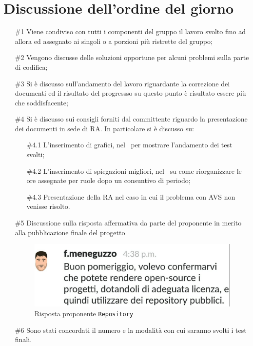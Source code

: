 \documentclass[../verbale-2017-05-03.tex]{subfiles}
\begin{document}
	\section{Discussione dell'ordine del giorno}
	\begin{itemize}
		\item [\#1] Viene condiviso con tutti i componenti del gruppo il lavoro svolto fino ad allora ed assegnato ai singoli o a porzioni più ristrette del gruppo;
		\item [\#2] Vengono discusse delle soluzioni opportune per alcuni problemi sulla parte di codifica;
		\item [\#3] Si è discusso sull'andamento del lavoro riguardante la correzione dei documenti ed il risultato del progressso su questo punto è risultato essere più che soddisfacente;
		\item [\#4] Si è discusso sui consigli forniti dal committente riguardo la presentazione dei documenti in sede di RA. In particolare si è discusso su:
			\begin{itemize}
				\item [\#4.1] L'inserimento di grafici, nel \pianodiqualifica\ per mostrare l'andamento dei test svolti;
				\item [\#4.2] L'inserimento di spiegazioni migliori, nel \pianodiprogetto\, su come riorganizzare le ore assegnate per ruole dopo un consuntivo di periodo;
				\item [\#4.3] Presentazione della RA nel caso in cui il problema con AVS non venisse risolto.
			\end{itemize}
		\item [\#5] Discussione sulla risposta affermativa da parte del proponente in merito alla pubblicazione finale del progetto
		\begin{figure}[!h]
			\centering
			\includegraphics[scale=0.2]{Immagini/repo.jpg}
			\caption{Risposta proponente \texttt{Repository}}
		\end{figure}
		\item [\#6] Sono stati concordati il numero e la modalità con cui saranno svolti i test finali.
	\end{itemize}
\end{document}
